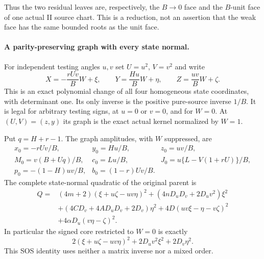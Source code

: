 Thus the two residual leaves are, respectively, the $B\to0$ face and
the $B$-unit face of one actual II source chart.  This is a reduction,
not an assertion that the weak face has the same bounded roots as the
unit face.

\paragraph{A parity-preserving graph with every state normal.}
For independent testing angles $u,v$ set $U=u^2$, $V=v^2$ and write
\[
 X=-\frac{rU v}{B}W+\xi,\qquad
 Y=\frac{Hu}{B}W+\eta,\qquad
 Z=\frac{uv}{B}W+\zeta.                         \tag{DI1}
\]
This is an exact polynomial change of all four homogeneous state
coordinates, with determinant one.  Its only inverse is the positive
pure-source inverse $1/B$.  It is legal for arbitrary testing signs,
at $u=0$ or $v=0$, and for $W=0$.  At $(U,V)=(z,y)$ its graph is the
exact actual kernel normalized by $W=1$.

Put $q=H+r-1$.  The graph amplitudes, with $W$ suppressed, are
\[
\begin{array}{lll}
 x_0=-rUv/B,&y_0=Hu/B,&z_0=uv/B,\\
 M_0=v(B+Uq)/B,&c_0=Lu/B,&J_0=u\{L-V(1+rU)\}/B,\\
 p_0=-(1-H)uv/B,&b_0=(1-r)Uv/B.&
\end{array}                                                   \tag{DI2}
\]
The complete state-normal quadratic of the original parent is
\[
\begin{split}
 Q={}&(4m+2)(\xi+u\zeta-uv\eta)^2
 +(4nD_uD_v+2D_uv^2)\xi^2\\
 &+(4CD_v+4AD_uD_v+2D_v)\eta^2
 +4D(uv\xi-\eta-v\zeta)^2\\
 &+4\alpha D_u(v\eta-\zeta)^2.
\end{split}                                  \tag{DI3}
\]
In particular the signed core restricted to $W=0$ is exactly
\[
 2(\xi+u\zeta-uv\eta)^2+2D_uv^2\xi^2+2D_v\eta^2.
\]
This SOS identity uses neither a matrix inverse nor a mixed order.

